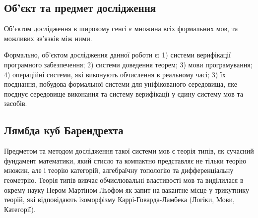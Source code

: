 \subsection{Об'єкт та предмет дослідження}
Об'єктом дослідження в широкому сенсі є множина
всіх формальних мов, та можливих зв'язків між ними.

Формально, об'єктом дослідження данної роботи є:
1) системи верифікації програмного забезпечення;
2) системи доведення теорем;
3) мови програмування;
4) операційні системи, які виконують обчислення в реальному часі;
3) їх поєднання, побудова формальної системи для
уніфікованого середовища, яке поєднує середовище
виконання та систему верифікації у єдину систему мов та засобів.

\subsection*{Лямбда куб Барендрехта}

\begin{center}
\end{center}

Предметом та методом дослідження такої системи мов є теорія типів,
як сучасний фундамент математики,
який стисло та компактно представляє не тільки теорію множин,
але і теорію категорій, алгебраїчну топологію та дифференціальну геометрію.
Теорія типів вивчає обчислювальні властивості мов та виділилася
в окрему науку Пером Мартіном-Льофом як запит на вакантне місце у
трикутнику теорій, які відповідають ізоморфізму
Каррі-Говарда-Ламбека (Логіки, Мови, Категорії).

